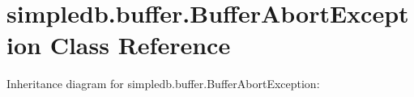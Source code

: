 \hypertarget{classsimpledb_1_1buffer_1_1BufferAbortException}{}\section{simpledb.\+buffer.\+Buffer\+Abort\+Exception Class Reference}
\label{classsimpledb_1_1buffer_1_1BufferAbortException}


Inheritance diagram for simpledb.\+buffer.\+Buffer\+Abort\+Exception\+:
